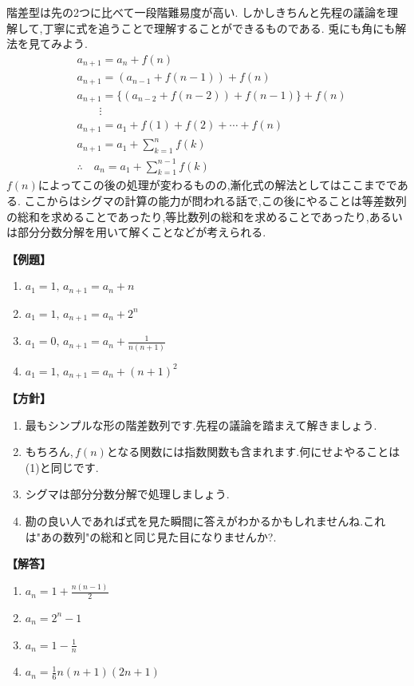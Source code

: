 
階差型は先の2つに比べて一段階難易度が高い.
しかしきちんと先程の議論を理解して,丁寧に式を追うことで理解することができるものである.
兎にも角にも解法を見てみよう.
\begin{align*}
   & a_{n+1}=a_n+f(n)                               \\
   & a_{n+1}=(a_{n-1}+f(n-1))+f(n)                  \\
   & a_{n+1}=\{(a_{n-2}+f(n-2))+f(n-1)\}+f(n)       \\
   & \qquad \vdots                                  \\
   & a_{n+1}=a_1+f(1)+f(2)+\cdots+f(n)              \\
   & a_{n+1}=a_1+\sum_{k=1}^{n} f(k)                \\
   & \therefore \quad a_n=a_1+\sum_{k=1}^{n-1} f(k)
\end{align*}
$f(n)$によってこの後の処理が変わるものの,漸化式の解法としてはここまでである.
ここからはシグマの計算の能力が問われる話で,この後にやることは等差数列の総和を求めることであったり,等比数列の総和を求めることであったり,あるいは部分分数分解を用いて解くことなどが考えられる.

\noindent \textbf{【例題】}
\begin{enumerate}[label=(\arabic*),parsep=3pt]
  \item $\displaystyle a_1=1,\, a_{n+1}=a_n+n$
  \item $\displaystyle a_1=1,\, a_{n+1}=a_n+2^n$
  \item $\displaystyle a_1=0,\, a_{n+1}=a_n+\frac{1}{n(n+1)}$
  \item $\displaystyle a_1=1,\, a_{n+1}=a_n+(n+1)^2$
\end{enumerate}

\noindent\textbf{【方針】}
\begin{enumerate}[label=(\arabic*),parsep=3pt]
  \item 最もシンプルな形の階差数列です.先程の議論を踏まえて解きましょう.
  \item もちろん,\,$f(n)$となる関数には指数関数も含まれます.何にせよやることは\,(1)と同じです.
  \item シグマは部分分数分解で処理しましょう.
  \item 勘の良い人であれば式を見た瞬間に答えがわかるかもしれませんね.これは"あの数列"の総和と同じ見た目になりませんか?.
\end{enumerate}

\noindent\textbf{【解答】}
\begin{enumerate}[label=(\arabic*),parsep=3pt]
  \item $\displaystyle a_n=1+\frac{n(n-1)}{2}$
  \item $\displaystyle a_n=2^n-1$
  \item $\displaystyle a_n=1-\frac{1}{n}$
  \item $\displaystyle a_n=\frac{1}{6}n(n+1)(2n+1)$
\end{enumerate}

